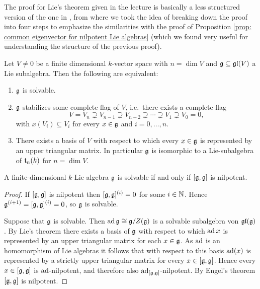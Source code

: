 \begin{rem}
 The proof for Lie’s theorem given in the lecture is basically a less structured version of the one in \cite[\S 4.1]{Humphreys}, from where we took the idea of breaking down the proof into four steps to emphasize the similarities with the proof of Proposition \ref{prop: common eigenvector for nilpotent Lie algebras} (which we found very useful for understanding the structure of the previous proof).
\end{rem}


\begin{prop}\label{prop: common eigenvector for solvable Lie algebras}
 Let $V \neq 0$ be a finite dimensional $k$-vector space with $n = \dim V$ and $\mathfrak{g} \subseteq \mathfrak{gl}(V)$ a Lie subalgebra. Then the following are equivalent:
 \begin{enumerate}[leftmargin=*]
  \item
   $\mathfrak{g}$ is solvable.
  \item
   $\mathfrak{g}$ stabilizes some complete flag of $V$, i.e.\ there exists a complete flag
   \[
    V = V_n \supsetneq V_{n-1} \supsetneq V_{n-2} \supsetneq \dotsb \supsetneq V_1 \supsetneq V_0 = 0,
   \]
   with $x(V_i) \subseteq V_i$ for every $x \in \mathfrak{g}$ and $i = 0, \dotsc, n$.
  \item
   There exists a basis of $V$ with respect to which every $x \in \mathfrak{g}$ is represented by an upper triangular matrix. In particular $\mathfrak{g}$ is isomorphic to a Lie-subalgebra of $\mathfrak{t}_n(k)$ for $n = \dim V$.
 \end{enumerate}
\end{prop}


\begin{cor}
 A finite-dimensional $k$-Lie algebra $\mathfrak{g}$ is solvable if and only if $[\mathfrak{g},\mathfrak{g}]$ is nilpotent.
\end{cor}
\begin{proof}
 If $[\mathfrak{g},\mathfrak{g}]$ is nilpotent then $[\mathfrak{g},\mathfrak{g}]^{(i)} = 0$ for some $i \in \mathbb{N}$. Hence $\mathfrak{g}^{(i+1)} = [\mathfrak{g},\mathfrak{g}]^{(i)} = 0$, so $\mathfrak{g}$ is solvable.
 
 Suppose that $\mathfrak{g}$ is solvable. Then $\operatorname{ad} \mathfrak{g} \cong \mathfrak{g}/Z(\mathfrak{g})$ is a solvable subalgebra von $\mathfrak{gl}(\mathfrak{g})$. By Lie’s theorem there exists a basis of $\mathfrak{g}$ with respect to which $\operatorname{ad} x$ is represented by an upper triangular matrix for each $x \in \mathfrak{g}$. As $\operatorname{ad}$ is an homomorphism of Lie algebras it follows that with respect to this basis $\operatorname{ad}(x)$ is represented by a strictly upper triangular matrix for every $x \in [\mathfrak{g},\mathfrak{g}]$. Hence every $x \in [\mathfrak{g},\mathfrak{g}]$ is $\operatorname{ad}$-nilpotent, and therefore also $\operatorname{ad}_{[\mathfrak{g},\mathfrak{g}]}$-nilpotent. By Engel’s theorem $[\mathfrak{g},\mathfrak{g}]$ is nilpotent.
\end{proof}


